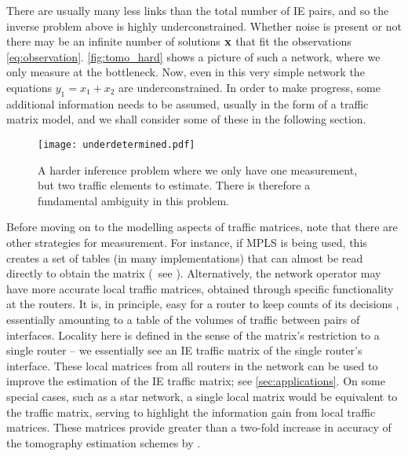 There are usually many less links than the total number of IE pairs,
and so the inverse problem above is highly underconstrained.  Whether
noise is present or not there may be an infinite number of solutions
$\mathbf{x}$ that fit the observations
\eqref{eq:observation}. \autoref{fig:tomo_hard} shows a picture of
such a network, where we only measure at the bottleneck. Now, even in
this very simple network the equations $y_1 = x_1 + x_2$ are
underconstrained. In order to make progress, some additional
information needs to be assumed, usually in the form of a traffic
matrix model, and we shall consider some of these in the following
section.



\begin{figure}[!thbp] 
  \begin{center}
    \texttt{[image: underdetermined.pdf]}
    \caption{A harder inference problem where we only have one
      measurement, but two traffic elements to estimate. There is
      therefore a fundamental ambiguity in this problem.
      \label{fig:tomo_hard}}
  \end{center}
\end{figure}         

Before moving on to the modelling aspects of traffic matrices, note that
there are other strategies for measurement. For instance, if MPLS is
being used, this creates a set of tables (in many implementations)
that can almost be read directly to obtain the matrix (\eg~see
\cite{blili08:_best_pract_deter_traff_matric}).  Alternatively, the
network operator may have more accurate local traffic matrices,
obtained through specific functionality at the routers. It is, in
principle, easy for a router to keep counts of its decisions
\cite{Varghese03Measure}, essentially amounting to a table of the
volumes of traffic between pairs of interfaces.  Locality here is
defined in the sense of the matrix's restriction to a single router --
we essentially see an IE traffic matrix of the single router's
interface.  These local matrices from all routers in the network can
be used to improve the estimation of the IE traffic matrix; see
\autoref{sec:applications}. On some special cases, such as a star
network, a single local matrix would be equivalent to the traffic
matrix, serving to highlight the information gain from local traffic
matrices. These matrices provide greater than a two-fold increase in
accuracy of the tomography estimation schemes by
\cite{Medina02TMdirections,Zhang03Fast}.

